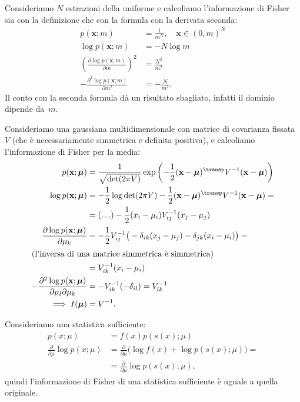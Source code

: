 \begin{example}
	Consideriamo $N$ estrazioni della uniforme e calcoliamo l'informazione di Fisher sia con la definizione che con la formula con la derivata seconda:
	\begin{align*}
		p(\mathbf x;m)
		&= \frac1{m^N}, \quad \mathbf x\in(0,m)^N \\
		\log p(\mathbf x;m)
		&= -N\log m \\
		\left( \frac{\partial\log p(\mathbf x;m)}{\partial m} \right)^2
		&= \frac{N^2}{m^2} \\
		-\frac{\partial^2\log p(\mathbf x;m)}{\partial m^2}
		&= -\frac N{m^2}.
	\end{align*}
	Il conto con la seconda formula dà un risultato sbagliato, infatti il dominio dipende da~$m$.
\end{example}

\begin{example}
	Consideriamo una gaussiana multidimensionale con matrice di covarianza fissata $V$ (che è necessariamente simmetrica e definita positiva), e calcoliamo l'informazione di Fisher per la media:
	\begin{align*}
		p(\mathbf x;\boldsymbol \mu)
		&= \frac1{\sqrt{\det(2\pi V)}}
		\exp \left( -\frac12 (\mathbf x-\boldsymbol\mu)^\transp V^{-1} (\mathbf x-\boldsymbol\mu) \right) \\
		\log p(\mathbf x;\boldsymbol\mu)
		&= -\frac12\log\det(2\pi V)
		- \frac12 (\mathbf x-\boldsymbol\mu)^\transp V^{-1} (\mathbf x-\boldsymbol\mu) = \\
		&= (\ldots) - \frac12 (x_i-\mu_i)V^{-1}_{ij}(x_j-\mu_j) \\
		\frac{\partial\log p(\mathbf x;\boldsymbol\mu)}{\partial\mu_k}
		&= -\frac12 V^{-1}_{ij} \big( -\delta_{ik}(x_j-\mu_j) - \delta_{jk}(x_i-\mu_i) \big) = \\
		\intertext{(l'inversa di una matrice simmetrica è simmetrica)}
		&= V^{-1}_{ik}(x_i-\mu_i) \\
		-\frac{\partial^2\log p(\mathbf x;\boldsymbol\mu)}{\partial\mu_l\partial\mu_k}
		&= -V^{-1}_{ik}(-\delta_{il}) = V^{-1}_{lk} \\
		\implies I(\boldsymbol\mu) &= V^{-1}.
	\end{align*}
\end{example}

Consideriamo una statistica sufficiente:
\begin{align*}
	p(x;\mu)
	&= f(x)p(s(x);\mu) \\
	\frac{\partial}{\partial\mu}\log p(x;\mu)
	&= \frac{\partial}{\partial\mu} \big( \log f(x) + \log p(s(x);\mu) \big) = \\
	&= \frac{\partial}{\partial\mu}\log p(s(x);\mu),
\end{align*}
quindi l'informazione di Fisher di una statistica sufficiente è uguale a quella originale.

